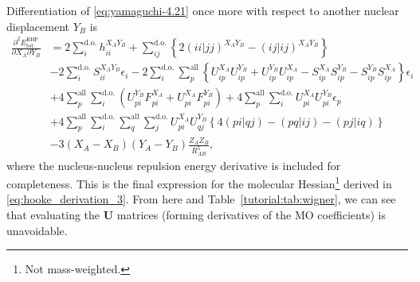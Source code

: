\documentclass[%
class = book,%
crop = false,%
float = true,%
multi = true,%
preview = false,%
]{standalone}
\begin{document}
Differentiation of \eqref{eq:yamaguchi-4.21} once more with respect to another nuclear displacement \(Y_{B}\) is
\begin{equation}
  \label{eq:yamaguchi-4.54-and-4.55-and-3.127}\tag{Yamaguchi eqs. 4.54, 4.55, 3.127}
  \begin{aligned}
    \frac{\partial^{2} E_{\text{tot}}^{\text{RHF}}}{\partial X_{A} \partial Y_{B}} &= 2 \sum_{i}^{\text{d.o.}} h_{ii}^{X_{A}Y_{B}} + \sum_{ij}^{\text{d.o.}} \left\{ 2(ii|jj)^{X_{A}Y_{B}} - (ij|ij)^{X_{A}Y_{B}} \right\} \\
    &- 2 \sum_{i}^{\text{d.o.}} S_{ii}^{X_{A}Y_{B}} \epsilon_{i} - 2 \sum_{i}^{\text{d.o.}} \sum_{p}^{\text{all}} \left\{ U_{ip}^{X_{A}}U_{ip}^{Y_{B}} + U_{ip}^{Y_{B}}U_{ip}^{X_{A}} - S_{ip}^{X_{A}}S_{ip}^{Y_{B}} - S_{ip}^{Y_{B}}S_{ip}^{X_{A}} \right\} \epsilon_{i} \\
    &+ 4 \sum_{p}^{\text{all}} \sum_{i}^{\text{d.o.}} \left( U_{pi}^{Y_{B}} F_{pi}^{X_{A}} + U_{pi}^{X_{A}} F_{pi}^{Y_{B}} \right) + 4 \sum_{p}^{\text{all}} \sum_{i}^{\text{d.o.}} U_{pi}^{X_{A}} U_{pi}^{Y_{B}} \epsilon_{p} \\
    &+ 4 \sum_{p}^{\text{all}} \sum_{i}^{\text{d.o.}} \sum_{q}^{\text{all}} \sum_{j}^{\text{d.o.}} U_{pi}^{X_{A}} U_{qj}^{Y_{B}} \left\{ 4(pi|qj) - (pq|ij) - (pj|iq) \right\} \\
    &- 3\left(X_{A}-X_{B}\right)\left(Y_{A}-Y_{B}\right)\frac{Z_{A}Z_{B}}{R_{AB}^{5}},
  \end{aligned}
\end{equation}
where the nucleus-nucleus repulsion energy derivative is included for completeness. This is the final expression for the molecular Hessian\footnote{Not mass-weighted.} derived in \eqref{eq:hooke_derivation_3}. From here and Table~\ref{tutorial:tab:wigner}, we can see that evaluating the \(\mathbf{U}\) matrices (forming derivatives of the MO coefficients) is unavoidable.
\end{document}
